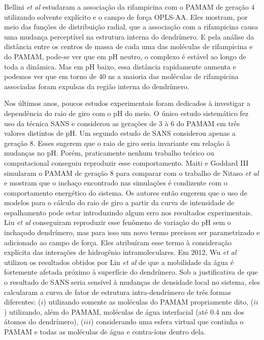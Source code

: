 Bellini \textit{et al}\cite{Bellini2015} estudaram a associação da rifampicina com o PAMAM de geração $4$ utilizando solvente explícito e o campo de força OPLS-AA\cite{Jorgensen1996}.
Eles mostram, por meio das funções de distribuição radial, que a associação com a rifampicina causa uma mudança perceptível na estrutura interna do dendrímero.
E pela análise da distância entre os centros de massa de cada uma das moléculas de rifampicina e do PAMAM, pode-se ver que em pH neutro, o complexo é estável ao longo de toda a dinâmica.
Mas em pH baixo, essa distância rapidamente aumenta e podemos ver que em torno de $40$ ns a maioria das moléculas de rifampicina associadas foram expulsas da região interna do dendrímero.

Nos últimos anos, poucos estudos experimentais foram dedicados à investigar a dependência do raio de giro com o pH do meio\cite{Porcar2008, Nisato2000}. O único estudo sistemático fez uso da técnica SANS e considerou as gerações de 3 à 6 do PAMAM em três valores distintos de pH. 
Um segundo estudo de SANS considerou apenas a geração 8.
Esses sugerem que o raio de giro seria invariante em relação à mudanças no pH.
Porém, praticamente nenhum trabalho teórico ou computacional conseguiu reproduzir esse comportamento.
Maiti e Goddard III\cite{Maiti2006} simularam o PAMAM de geração $8$ para comparar com o trabalho de Nitaso \textit{et al}\cite{Nisato2000} e mostram que o inchaço encontrado nas simulações é condizente com o comportamento energético do sistema.
Os autores então sugerem que o uso de modelos para o cálculo do raio de giro a partir da curva de intensidade de espalhamento pode estar introduzindo algum erro nos resultados experimentais.
Liu \textit{et al}\cite{Liu2009} conseguiram reproduzir esse fenômeno de variação do pH sem o inchaçodo dendrímero, mas para isso um novo termo precisou ser parametrizado e adicionado ao campo de força.
Eles atribuíram esse termo à consideração explícita das interações de hidrogênio intramoleculares.
Em 2012, Wu \textit{et al}\cite{Wu2012} utilizou os resultados obtidos por Lin \textit{et al}\cite{Lin2005} de que a mobilidade da água é fortemente afetada próximo à superfície do dendrímero.
Sob a justificativa de que o resultado de SANS seria sensível à mudanças de densidade local no sistema, eles calcularam a curva de fator de estrutura intra-dendrímero de três formas diferentes:
($i$)  utilizando somente as moléculas do PAMAM propriamente dito,
($ii$) utilizando, além do PAMAM, moléculas de água interfacial (até $0.4$ nm dos átomos do dendrímero),
($iii$) considerando uma esfera virtual que continha o PAMAM e todas as moléculas de água e contra-íons dentro dela.

